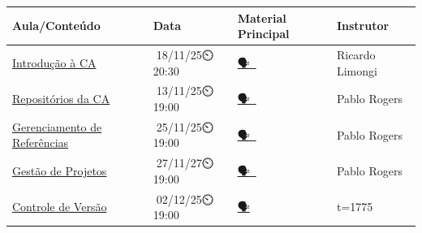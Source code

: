 \documentclass[
  a4paper,
]{book}
\newcommand{\emojitext}[1]{{\emoji #1}}
\begin{document}
\begin{longtable}[]{@{}
  >{\raggedright\arraybackslash}p{}
  >{\centering\arraybackslash}p{}
  >{\centering\arraybackslash}p{}
  >{\centering\arraybackslash}p{}@{}}
\toprule\noalign{}
\begin{minipage}[b]{\linewidth}\raggedright
Aula/Conteúdo
\end{minipage} & \begin{minipage}[b]{\linewidth}\centering
Data
\end{minipage} & \begin{minipage}[b]{\linewidth}\centering
Material Principal
\end{minipage} & \begin{minipage}[b]{\linewidth}\centering
Instrutor
\end{minipage} \\
\midrule\noalign{}
\endhead
\bottomrule\noalign{}
\endlastfoot
\href{01-intro.html}{Introdução à CA} &
\emojitext{📅}18/11/25\emojitext{⏲️}20:30 &
\href{./resources/01-intro.pdf}{\emojitext{🗣}}\href{https://www.youtube.com/live/7ewEcTATkZM?si=Lq40IAoDgsy_A619}{\emojitext{🎥}}\href{https://doi.org/10.1590/S0034-759020230408}{\emojitext{📓}}
& Ricardo Limongi \\
\href{02-osf.html}{Repositórios da CA} &
\emojitext{📅}13/11/25\emojitext{⏲️}19:00 &
\href{https://osf.io/wm8vs}{\emojitext{🗣️}}\href{https://www.youtube.com/watch?v=B19MPDJX_vs}{\emojitext{🎥}}\href{https://doi.org/10.1002/cpet.32}{\emojitext{📓}}
& Pablo Rogers \\
\href{03-zotero.html}{Gerenciamento de Referências} &
\emojitext{📅}25/11/25\emojitext{⏲️}19:00 &
\href{https://osf.io/emxz8}{\emojitext{🗣️}}\href{https://youtu.be/tnbwKj6-pD8?si=Yx9IC2LhrplvA6g1}{\emojitext{🎥}}\href{https://kuscholarworks.ku.edu/handle/1808/34983}{\emojitext{📓}}
& Pablo Rogers \\
\href{04-project.html}{Gestão de Projetos} &
\emojitext{📅}27/11/27\emojitext{⏲️}19:00 &
\href{./resources/04-project.pdf}{\emojitext{🗣️}}\href{https://youtu.be/l8yh3f8Tbv8?si=Yeq-xRxmffF7S1dk}{\emojitext{🎥}}\href{https://doi.org/10.1371/journal.pcbi.1005510}{\emojitext{📓}}
& Pablo Rogers \\
\href{05-git.html}{Controle de Versão} &
\emojitext{📅}02/12/25\emojitext{⏲️}19:00 &
\href{./resources/05-git.pdf}{\emojitext{🗣️}}\href{https://youtu.be/uQL6NOSd9cc?si=TIYenlvIzKpoQ2dQ&t=1775}{\emojitext{🎥}}\href{https://doi.org/10.1177/2515245918754826}{\emojitext{📓}}

\end{longtable}
\end{document}
